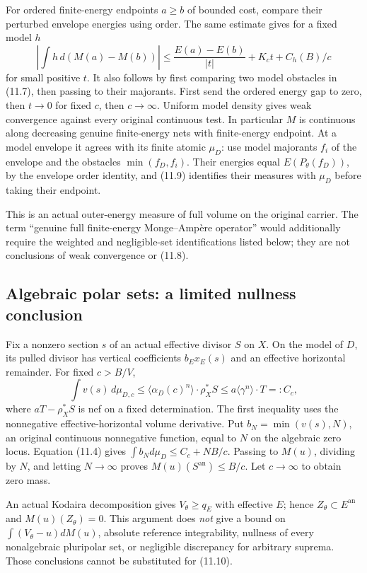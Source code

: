 \documentclass[10pt]{article}
\newcommand{\an}{\mathrm{an}}
\begin{document}
For ordered finite-energy endpoints $a\geq b$ of bounded cost, compare
their perturbed envelope energies using order. The same estimate gives
for a fixed model $h$
\[
 \left|\int h\,d(M(a)-M(b))\right|
 \leq \frac{E(a)-E(b)}{|t|}+K_ct+C_h(B)/c             \tag{11.9}
\]
for small positive $t$. It also follows by first comparing two model
obstacles in (11.7), then passing to their majorants. First send the
ordered energy gap to zero, then $t\to0$ for fixed $c$, then $c\to\infty$.
Uniform model density gives weak convergence against every original
continuous test. In particular $M$ is continuous along decreasing genuine
finite-energy nets with finite-energy endpoint. At a model envelope it
agrees with its finite atomic $\mu_D$: use model majorants $f_i$ of the
envelope and the obstacles $\min(f_D,f_i)$. Their energies equal
$E(P_\theta(f_D))$, by the envelope order identity, and (11.9) identifies
their measures with $\mu_D$ before taking their endpoint.

This is an actual outer-energy measure of full volume on the original
carrier. The term ``genuine full finite-energy Monge--Amp\`ere operator''
would additionally require the weighted and negligible-set identifications
listed below; they are not conclusions of weak convergence or (11.8).

\subsection{Algebraic polar sets: a limited nullness conclusion}
Fix a nonzero section $s$ of an actual effective divisor $S$ on $X$.
On the model of $D$, its pulled divisor has vertical coefficients
$b_Ex_E(s)$ and an effective horizontal remainder. For fixed $c>B/V$,
\[
 \int v(s)\,d\mu_{D,c}
 \leq\langle\alpha_D(c)^n\rangle\cdot\rho_X^*S
 \leq a\langle\gamma^n\rangle\cdot T=:C_c,           \tag{11.10}
\]
where $aT-\rho_X^*S$ is nef on a fixed determination. The first inequality
uses the nonnegative effective-horizontal volume derivative. Put
$b_N=\min(v(s),N)$, an original continuous nonnegative function, equal
to $N$ on the algebraic zero locus. Equation (11.4) gives
$\int b_Nd\mu_D\leq C_c+NB/c$. Passing to $M(u)$, dividing by $N$, and
letting $N\to\infty$ proves
$M(u)(S^{\an})\leq B/c$. Let $c\to\infty$ to obtain zero mass.

An actual Kodaira decomposition gives $V_\theta\geq q_E$ with effective
$E$; hence $Z_\theta\subset E^{\an}$ and $M(u)(Z_\theta)=0$.
This argument does \emph{not} give a bound on
$\int(V_\theta-u)dM(u)$, absolute reference integrability, nullness of
every nonalgebraic pluripolar set, or negligible discrepancy for arbitrary
suprema. Those conclusions cannot be substituted for (11.10).
\end{document}
